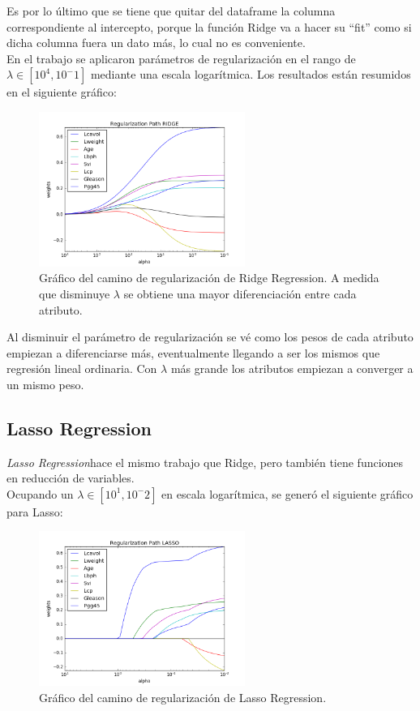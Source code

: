 \documentclass[letter, 10pt]{article}
\begin{document}
Es por lo último que se tiene que quitar del dataframe la columna
correspondiente al intercepto, porque la función Ridge va a hacer su ``fit''
como si dicha columna fuera un dato más, lo cual no es conveniente.\\


En el trabajo se aplicaron parámetros de regularización en el rango de $\lambda
\in [10^4,10^-1]$ mediante una escala logarítmica. Los resultados están resumidos
en el siguiente gráfico:

\begin{figure}[H]
  \centering
  \includegraphics[width=0.6\textwidth]{Images/p3_fig1.png} 
  \caption{Gráfico del camino de regularización de Ridge Regression. A medida
    que disminuye $\lambda$ se obtiene una mayor diferenciación entre cada atributo.}
  \label{fig:p3_g1}
\end{figure}

Al disminuir el parámetro de regularización se vé como los pesos de cada
atributo empiezan a diferenciarse más, eventualmente llegando a ser los mismos
que regresión lineal ordinaria. Con $\lambda$ más grande los atributos
empiezan a converger a un mismo peso.

\subsection{Lasso Regression}
\textit{Lasso Regression}hace el mismo trabajo que Ridge, pero también tiene
funciones en reducción de variables.\\

Ocupando un $\lambda \in [10^1,10^-2]$ en escala logarítmica, se generó el
siguiente gráfico para Lasso:


\begin{figure}[H]
  \centering
  \includegraphics[width=0.6\textwidth]{Images/p3_fig2.png} 
  \caption{Gráfico del camino de regularización de Lasso Regression.}
  \label{fig:p3_g1}
\end{figure}
\end{document}
